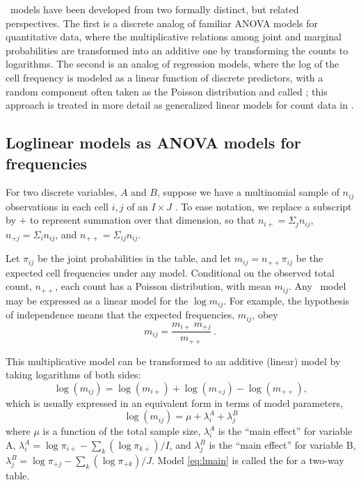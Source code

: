 \documentclass[11pt]{book}\usepackage[]{graphicx}\usepackage[]{color}
\begin{document}
\Loglin\ models have been developed from two formally distinct,
but related perspectives.  The first is a discrete analog of familiar
ANOVA models
for quantitative data, where the multiplicative relations among joint and marginal probabilities are transformed into an additive one by transforming
the counts to logarithms.
The second is an analog of regression models, where the log of the
cell frequency is modeled as a linear function of discrete predictors,
with a random component often taken as the Poisson distribution
and called ; this approach is treated in more detail as
generalized linear models for count data in .

\subsection{Loglinear models as ANOVA models for frequencies}
For two discrete variables, $A$ and $B$, suppose we have a multinomial sample of $n_{ij}$ observations in each cell $i,j$ of an $I \times J$
\ctab.   To ease notation, we replace a subscript by $+$ to represent
summation over that dimension, so that $n_{i+} = \Sigma_j n_{ij}$,
$n_{+j} = \Sigma_i n_{ij}$, and $n_{++} = \Sigma_{ij} n_{ij}$.

Let $\pi_{ij}$ be the joint probabilities in the table, and let
$m_{ij} = n_{++} \pi_{ij}$ be the expected cell frequencies under
any model.
Conditional on the observed total count, $n_{++}$,
each count has a Poisson distribution, with mean $m_{ij}$.
Any \loglin\ model may be expressed as a linear model for the $\log m_{ij}$.
For
example, the hypothesis of independence means that the expected
frequencies, \(m_{ij}\), obey
\begin{equation*}%
  m_{ij} = \frac{ m_{i+} \:  m_{+j} } {m_{++}}
  \period
\end{equation*}

This multiplicative model can be transformed to an additive (linear)
model by taking logarithms of both sides:
\begin{equation*}
  \log ( m_{ij} ) = \log ( m_{i+} )  +  \log ( m_{+j} )
 - \log ( m_{++} )
 \comma
\end{equation*}
which is usually expressed in an equivalent form in terms of model
parameters,
\begin{equation} \label{eq:lmain}
\log ( m_{ij} ) = \mu  +  \lambda_i^A +  \lambda_j^B
\end{equation}
where \(\mu\) is a function of the total sample size, \(\lambda_i^A\)
is the ``main effect'' for variable A,
\(\lambda_i^A = \log \pi_{i+} - \sum_k(\log \pi_{k+}) / I \),
 and \(\lambda_j^B\) is the
``main effect'' for variable B,
\(\lambda_j^B = \log \pi_{+j} - \sum_k(\log \pi_{+k}) / J \).
Model \eqref{eq:lmain} is called the 
for a two-way table.
\end{document}
